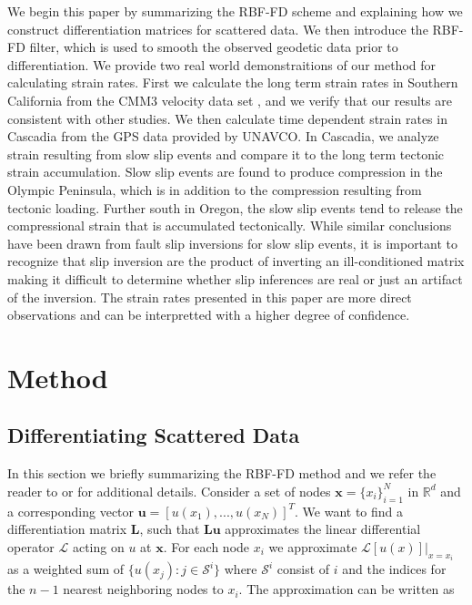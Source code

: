 \documentclass[10pt,a4paper]{article}
\begin{document}
We begin this paper by summarizing the RBF-FD scheme and explaining how we construct differentiation matrices for scattered data. We then introduce the RBF-FD filter, which is used to smooth the observed geodetic data prior to differentiation.  We provide two real world demonstraitions of our method for calculating strain rates.  First we calculate the long term strain rates in Southern California from the CMM3 velocity data set \citep{Shen2011}, and we verify that our results are consistent with other studies. We then calculate time dependent strain rates in Cascadia from the GPS data provided by UNAVCO.  In Cascadia, we analyze strain resulting from slow slip events and compare it to the long term tectonic strain accumulation. Slow slip events are found to produce compression in the Olympic Peninsula, which is in addition to the compression resulting from tectonic loading.  Further south in Oregon, the slow slip events tend to release the compressional strain that is accumulated tectonically.  While similar conclusions have been drawn from fault slip inversions for slow slip events, it is important to recognize that slip inversion are the product of inverting an ill-conditioned matrix making it difficult to determine whether slip inferences are real or just an artifact of the inversion.  The strain rates presented in this paper are more direct observations and can be interpretted with a higher degree of confidence. 

\section{Method}\label{sec:Method}
\subsection{Differentiating Scattered Data}\label{sec:Differentiating}

In this section we briefly summarizing the RBF-FD method and we refer the reader to \citet{Wright2006} or \citet{Fornberg2015} for additional details. Consider a set of nodes $\mathbf{x} = \{x_i\}_{i=1}^N$ in $\mathbb{R}^d$ and a corresponding vector $\mathbf{u} = [u(x_1), ..., u(x_N)]^T$.  We want to find a differentiation matrix $\mathbf{L}$, such that $\mathbf{Lu}$ approximates the linear differential operator $\mathcal{L}$ acting on $u$ at $\mathbf{x}$.  For each node $x_i$ we approximate $\mathcal{L}[u(x)]\big|_{x=x_i}$ as a weighted sum of $\{u(x_j): j \in \mathcal{S}^i\}$ where $\mathcal{S}^i$ consist of $i$ and the indices for the $n-1$ nearest neighboring nodes to $x_i$.  The approximation can be written as
\end{document}
